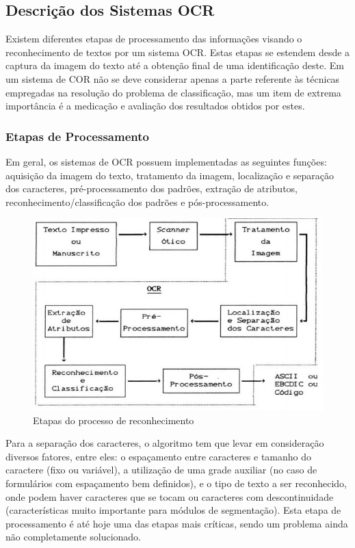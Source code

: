 	\subsection{Descrição dos Sistemas OCR}
		
		Existem diferentes etapas de processamento das informações visando o reconhecimento de textos por um sistema OCR. Estas etapas se estendem desde a captura da imagem do texto até a obtenção final de uma identificação deste. Em um sistema de COR não se deve considerar apenas a parte referente às técnicas empregadas na resolução do problema de classificação, mas um item de extrema importância é a medicação e avaliação dos resultados obtidos por estes.
		
		\subsubsection{Etapas de Processamento}
			
			Em geral, os sistemas de OCR possuem implementadas as seguintes funções: aquisição da imagem do texto, tratamento da imagem, localização e separação dos caracteres, pré-processamento dos padrões, extração de atributos, reconhecimento/classificação dos padrões e pós-processamento.
		
		\begin{figure}[!htb]
			\centering
			\includegraphics[scale=0.5]{img/etapas-de-processamento.jpg}
			\caption{Etapas do processo de reconhecimento}
			\label{Etapas do processo de reconhecimento}
		\end{figure}
		
		Para a separação dos caracteres, o algoritmo tem que levar em consideração diversos fatores, entre eles: o espaçamento entre caracteres e tamanho do caractere (fixo ou variável), a utilização de uma grade auxiliar (no caso de formulários com espaçamento bem definidos), e o tipo de texto a ser reconhecido, onde podem haver caracteres que se tocam ou caracteres com descontinuidade (características muito importante para módulos de segmentação). Esta etapa de processamento é até hoje uma das etapas mais críticas, sendo um problema ainda não completamente solucionado.
		
